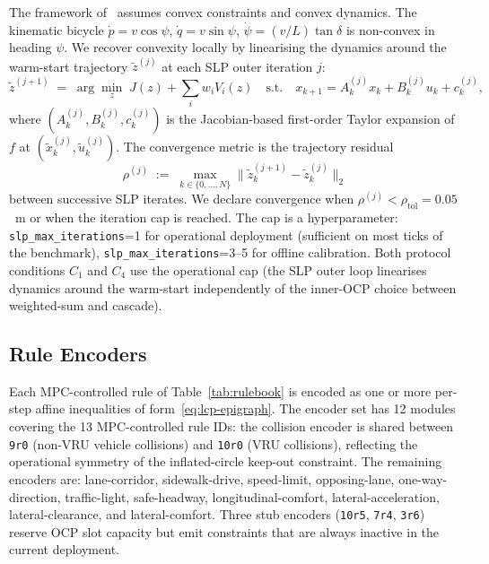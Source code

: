 The framework of~\cite{lcp2025} assumes convex constraints and convex dynamics. The kinematic bicycle $\dot p = v\cos\psi$, $\dot q = v\sin\psi$, $\dot\psi = (v/L)\tan\delta$ is non-convex in heading $\psi$. We recover convexity locally by linearising the dynamics around the warm-start trajectory $\tilde z^{(j)}$ at each SLP outer iteration $j$:
\begin{equation}
    \tilde z^{(j+1)} \;=\; \arg\min_{z} \; J(z) + \sum_i w_i V_i(z)\quad \text{s.t.}\quad x_{k+1} = A_k^{(j)} x_k + B_k^{(j)} u_k + c_k^{(j)},
    \label{eq:slp-iter}
\end{equation}
where $(A_k^{(j)}, B_k^{(j)}, c_k^{(j)})$ is the Jacobian-based first-order Taylor expansion of $f$ at $(\tilde x_k^{(j)}, \tilde u_k^{(j)})$. The convergence metric is the trajectory residual
\begin{equation}
    \rho^{(j)} \;:=\; \max_{k \in \{0, \ldots, N\}} \bigl\| \tilde z_k^{(j+1)} - \tilde z_k^{(j)} \bigr\|_2
    \label{eq:slp-residual}
\end{equation}
between successive SLP iterates. We declare convergence when $\rho^{(j)} < \rho_{\mathrm{tol}} = 0.05$~m or when the iteration cap is reached. The cap is a hyperparameter: \texttt{slp\_max\_iterations}=1 for operational deployment (sufficient on most ticks of the benchmark), \texttt{slp\_max\_iterations}=3--5 for offline calibration. Both protocol conditions $C_1$ and $C_4$ use the operational cap (the SLP outer loop linearises dynamics around the warm-start independently of the inner-OCP choice between weighted-sum and cascade).

\subsection{Rule Encoders}
\label{sec:deployment:encoders}

Each MPC-controlled rule of Table~\ref{tab:rulebook} is encoded as one or more per-step affine inequalities of form~\eqref{eq:lcp-epigraph}. The encoder set has 12 modules covering the 13 MPC-controlled rule IDs: the collision encoder is shared between \texttt{9r0} (non-VRU vehicle collisions) and \texttt{10r0} (VRU collisions), reflecting the operational symmetry of the inflated-circle keep-out constraint. The remaining encoders are: lane-corridor, sidewalk-drive, speed-limit, opposing-lane, one-way-direction, traffic-light, safe-headway, longitudinal-comfort, lateral-acceleration, lateral-clearance, and lateral-comfort. Three stub encoders (\texttt{10r5}, \texttt{7r4}, \texttt{3r6}) reserve OCP slot capacity but emit constraints that are always inactive in the current deployment.

